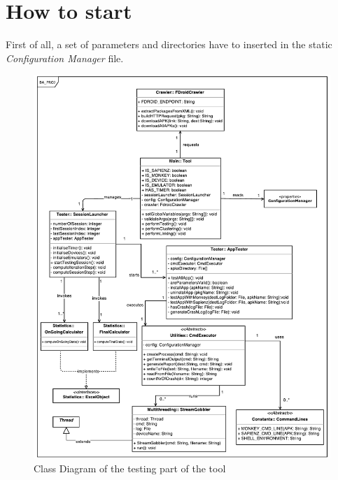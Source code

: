 









\section{How to start \toolname}
First of all, a set of parameters and directories have to inserted in the static \textit{Configuration Manager} file.

\begin{figure}[tb]
\centering 
\includegraphics[width=\columnwidth]{diagrams/testing.pdf} 
\caption{Class Diagram of the testing part of the tool }
\label{testing}
\vspace{-3mm} 
\end{figure}


